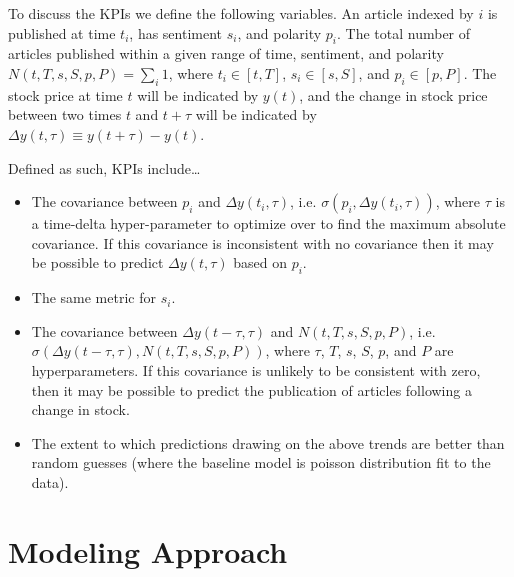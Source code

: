 \documentclass{article}
\begin{document}
To discuss the KPIs we define the following variables.
An article indexed by $i$ is published at time $t_i$, has sentiment $s_i$, and polarity $p_i$.
The total number of articles published within a given range of time, sentiment, and polarity $N( t, T, s, S, p, P) = \sum_i 1$, where $t_i \in [ t, T ]$, $s_i \in [ s, S ]$, and $p_i \in [ p, P ]$.
The stock price at time $t$ will be indicated by $y(t)$,
and the change in stock price between two times $t$ and $t + \tau$ will be indicated by $\Delta y(t,\tau) \equiv y(t + \tau) - y(t)$.

Defined as such, KPIs include\ldots
\begin{itemize}
    \item The covariance between $p_i$ and $\Delta y(t_i,\tau)$, i.e. $\sigma( p_i, \Delta y(t_i, \tau))$, where $\tau$ is a time-delta hyper-parameter to optimize over to find the maximum absolute covariance. If this covariance is inconsistent with no covariance then it may be possible to predict $\Delta y(t, \tau)$ based on $p_i$.
    \item The same metric for $s_i$.
    \item The covariance between $\Delta y(t-\tau, \tau)$ and $N(t, T, s, S, p, P )$, i.e. $\sigma( \Delta y(t-\tau, \tau), N(t, T, s, S, p, P ))$, where $\tau$, $T$, $s$, $S$, $p$, and $P$ are hyperparameters. If this covariance is unlikely to be consistent with zero, then it may be possible to predict the publication of articles following a change in stock.
    \item The extent to which predictions drawing on the above trends are better than random guesses (where the baseline model is poisson distribution fit to the data).
\end{itemize}

\section*{Modeling Approach}
\end{document}
